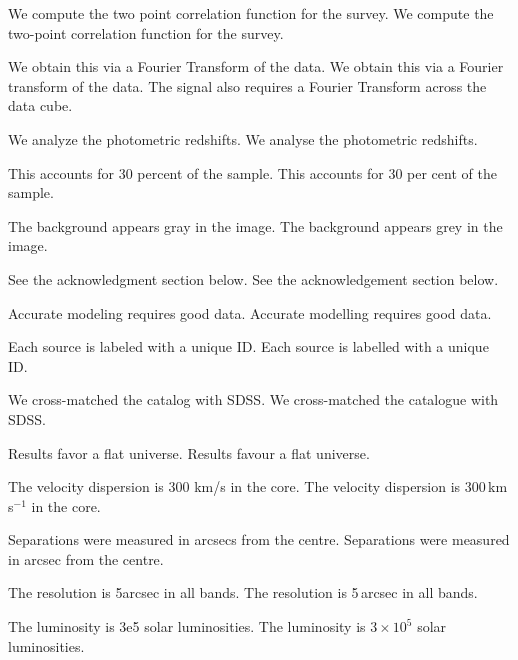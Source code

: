 \documentclass{article}
\begin{document}
We compute the two point %
correlation function for the survey.
We compute the two-point correlation function for the survey. %

We obtain this via a Fourier Transform of the data. %
We obtain this via a Fourier transform of the data. %
The signal also requires a Fourier %
Transform across the data cube.


We analyze the photometric redshifts. %
We analyse the photometric redshifts. %

This accounts for 30 percent of the sample. %
This accounts for 30 per cent of the sample. %

The background appears gray in the image. %
The background appears grey in the image. %

See the acknowledgment section below. %
See the acknowledgement section below. %

Accurate modeling requires good data. %
Accurate modelling requires good data. %

Each source is labeled with a unique ID. %
Each source is labelled with a unique ID. %

We cross-matched the catalog with SDSS. %
We cross-matched the catalogue with SDSS. %

Results favor a flat universe. %
Results favour a flat universe. %


The velocity dispersion is 300 km/s in the core. %
The velocity dispersion is 300\,km\,s$^{-1}$ in the core. %

Separations were measured in arcsecs from the centre. %
Separations were measured in arcsec from the centre. %

The resolution is 5arcsec in all bands. %
The resolution is 5\,arcsec in all bands. %

The luminosity is 3e5 solar luminosities. %
The luminosity is $3 \times 10^{5}$ solar luminosities. %
\end{document}
